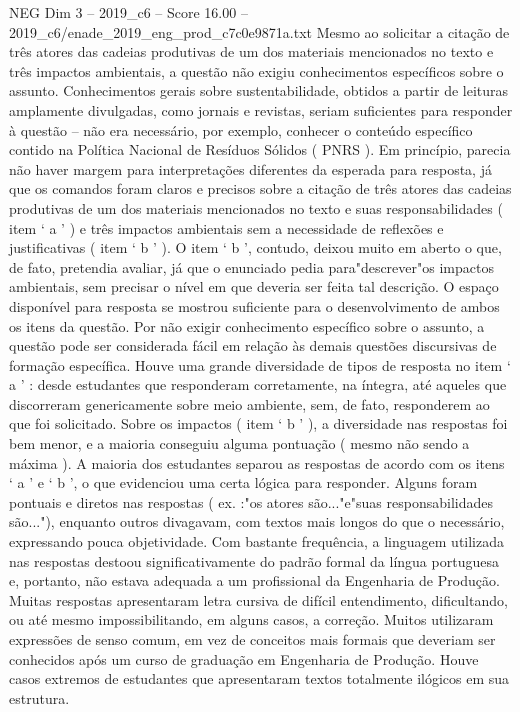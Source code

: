 \begin{textsample}{NEG Dim 3 – 2019\_c6 – Score 16.00 – 2019\_c6/enade\_2019\_eng\_prod\_c7c0e9871a.txt}
Mesmo ao solicitar a citação de três atores das cadeias produtivas de um dos materiais mencionados no texto e três impactos ambientais, a questão não exigiu conhecimentos específicos sobre o assunto.
Conhecimentos gerais sobre sustentabilidade, obtidos a partir de leituras amplamente divulgadas, como jornais e revistas, seriam suficientes para responder à questão – não era necessário, por exemplo, conhecer o conteúdo específico contido na Política Nacional de Resíduos Sólidos ( PNRS ).
Em princípio, parecia não haver margem para interpretações diferentes da esperada para resposta, já que os comandos foram claros e precisos sobre a citação de três atores das cadeias produtivas de um dos materiais mencionados no texto e suas responsabilidades ( item ‘ a ’ ) e três impactos ambientais sem a necessidade de reflexões e justificativas ( item ‘ b ’ ).
O item ‘ b ’, contudo, deixou muito em aberto o que, de fato, pretendia avaliar, já que o enunciado pedia para"descrever"os impactos ambientais, sem precisar o nível em que deveria ser feita tal descrição.
O espaço disponível para resposta se mostrou suficiente para o desenvolvimento de ambos os itens da questão.
Por não exigir conhecimento específico sobre o assunto, a questão pode ser considerada fácil em relação às demais questões discursivas de formação específica.
Houve uma grande diversidade de tipos de resposta no item ‘ a ’ : desde estudantes que responderam corretamente, na íntegra, até aqueles que discorreram genericamente sobre meio ambiente, sem, de fato, responderem ao que foi solicitado.
Sobre os impactos ( item ‘ b ’ ), a diversidade nas respostas foi bem menor, e a maioria conseguiu alguma pontuação ( mesmo não sendo a máxima ).
A maioria dos estudantes separou as respostas de acordo com os itens ‘ a ’ e ‘ b ’, o que evidenciou uma certa lógica para responder.
Alguns foram pontuais e diretos nas respostas ( ex. :"os atores são..."e"suas responsabilidades são..."), enquanto outros divagavam, com textos mais longos do que o necessário, expressando pouca objetividade.
Com bastante frequência, a linguagem utilizada nas respostas destoou significativamente do padrão formal da língua portuguesa e, portanto, não estava adequada a um profissional da Engenharia de Produção.
Muitas respostas apresentaram letra cursiva de difícil entendimento, dificultando, ou até mesmo impossibilitando, em alguns casos, a correção.
Muitos utilizaram expressões de senso comum, em vez de conceitos mais formais que deveriam ser conhecidos após um curso de graduação em Engenharia de Produção.
Houve casos extremos de estudantes que apresentaram textos totalmente ilógicos em sua estrutura.

\end{textsample}
